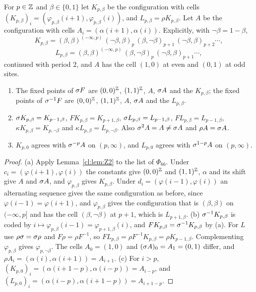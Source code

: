 \begin{definition}\label{c24:def:kinks}
For $p\in\mathbb{Z}$ and $\beta\in\{0,1\}$ let $K_{p,\beta}$ be the configuration with cells $(K_{p,\beta})_i=(\varphi_{p,\beta}(i+1),\varphi_{p,\beta}(i))$, and $L_{p,\beta}=\rho K_{p,\beta}$. Let $A$ be the configuration with cells $A_i=(\alpha(i+1),\alpha(i))$. Explicitly, with $\neg\beta=1-\beta$,
\[
K_{p,\beta}=(\beta,\beta)^{(-\infty,p)}\,(\neg\beta,\beta)_p\,(\beta,\neg\beta)_{p+1}\,(\neg\beta,\beta)_{p+2}\cdots,
\]
\[
L_{p,\beta}=(\beta,\beta)^{(-\infty,p)}\,(\beta,\neg\beta)_p\,(\neg\beta,\beta)_{p+1}\cdots,
\]
continued with period $2$, and $A$ has the cell $(1,0)$ at even and $(0,1)$ at odd sites.
\end{definition}

\begin{lemma}[kinks]\label{c24:lem:kinks}
\begin{enumerate}
\item[(a)] The fixed points of $\sigma F$ are $(0,0)^{\mathbb{Z}}$, $(1,1)^{\mathbb{Z}}$, $A$, $\sigma A$ and the $K_{p,\beta}$; the fixed points of $\sigma^{-1}F$ are $(0,0)^{\mathbb{Z}}$, $(1,1)^{\mathbb{Z}}$, $A$, $\sigma A$ and the $L_{p,\beta}$.
\item[(b)] $\sigma K_{p,\beta}=K_{p-1,\beta}$, $FK_{p,\beta}=K_{p+1,\beta}$, $\sigma L_{p,\beta}=L_{p-1,\beta}$, $FL_{p,\beta}=L_{p-1,\beta}$, $\kappa K_{p,\beta}=K_{p,\neg\beta}$ and $\kappa L_{p,\beta}=L_{p,\neg\beta}$. Also $\sigma^2A=A\ne\sigma A$ and $\rho A=\sigma A$.
\item[(c)] $K_{p,0}$ agrees with $\sigma^{-p}A$ on $(p,\infty)$, and $L_{p,0}$ agrees with $\sigma^{1-p}A$ on $(p,\infty)$.
\end{enumerate}
\end{lemma}

\begin{proof}
(a) Apply Lemma~\ref{cl:lem:Z2} to the list of $\Phi_{66}$. Under $c_i=(\varphi(i+1),\varphi(i))$ the constants give $(0,0)^{\mathbb{Z}}$ and $(1,1)^{\mathbb{Z}}$, $\alpha$ and its shift give $A$ and $\sigma A$, and $\varphi_{p,\beta}$ gives $K_{p,\beta}$. Under $d_i=(\varphi(i-1),\varphi(i))$ an alternating sequence gives the same configuration as before, since $\varphi(i-1)=\varphi(i+1)$, and $\varphi_{p,\beta}$ gives the configuration that is $(\beta,\beta)$ on $(-\infty,p]$ and has the cell $(\beta,\neg\beta)$ at $p+1$, which is $L_{p+1,\beta}$. (b) $\sigma^{-1}K_{p,\beta}$ is coded by $i\mapsto\varphi_{p,\beta}(i-1)=\varphi_{p+1,\beta}(i)$, and $FK_{p,\beta}=\sigma^{-1}K_{p,\beta}$ by (a). For $L$ use $\rho\sigma=\sigma\rho$ and $F\rho=\rho F^{-1}$, so $FL_{p,\beta}=\rho F^{-1}K_{p,\beta}=\rho K_{p-1,\beta}$. Complementing $\varphi_{p,\beta}$ gives $\varphi_{p,\neg\beta}$. The cells $A_0=(1,0)$ and $(\sigma A)_0=A_1=(0,1)$ differ, and $\rho A_i=(\alpha(i),\alpha(i+1))=A_{i+1}$. (c) For $i>p$, $(K_{p,0})_i=(\alpha(i+1-p),\alpha(i-p))=A_{i-p}$, and $(L_{p,0})_i=(\alpha(i-p),\alpha(i+1-p))=A_{i+1-p}$.
\end{proof}

